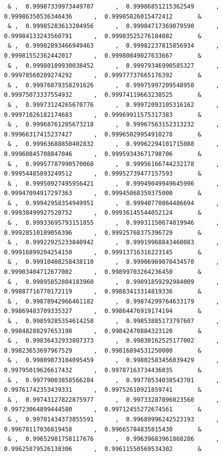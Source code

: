 \documentclass[a4paper,10pt]{report}
\begin{document}
{\begin{verbatim}
 & ,  0.99987339973449707      ,  0.99986851215362549      ,  0.99986350536346436      ,  0.99985826015472412       &
 & ,  0.99985283613204956      ,  0.99984717369079590      ,  0.99984133243560791      ,  0.99983525276184082       &
 & ,  0.99982893466949463      ,  0.99982237815856934      ,  0.99981552362442017      ,  0.99980849027633667       &
 & ,  0.99980109930038452      ,  0.99979346990585327      ,  0.99978560209274292      ,  0.99977737665176392       &
 & ,  0.99976879358291626      ,  0.99975997209548950      ,  0.99975073337554932      ,  0.99974119663238525       &
 & ,  0.99973124265670776      ,  0.99972093105316162      ,  0.99971026182174683      ,  0.99969911575317383       &
 & ,  0.99968761205673218      ,  0.99967563152313232      ,  0.99966317415237427      ,  0.99965029954910278       &
 & ,  0.99963688850402832      ,  0.99962294101715088      ,  0.99960845708847046      ,  0.99959343671798706       &
 & ,  0.99957787990570068      ,  0.99956166744232178      ,  0.99954485893249512      ,  0.99952739477157593       &
 & ,  0.99950927495956421      ,  0.99949049949645996      ,  0.99947094917297363      ,  0.99945068359375000       &
 & ,  0.99942958354949951      ,  0.99940770864486694      ,  0.99938499927520752      ,  0.99936145544052124       &
 & ,  0.99933695793151855      ,  0.99931150674819946      ,  0.99928510189056396      ,  0.99925768375396729       &
 & ,  0.99922925233840942      ,  0.99919968843460083      ,  0.99916899204254150      ,  0.99913716316223145       &
 & ,  0.99910408258438110      ,  0.99906969070434570      ,  0.99903404712677002      ,  0.99899703264236450       &
 & ,  0.99895852804183960      ,  0.99891859292984009      ,  0.99887716770172119      ,  0.99883413314819336       &
 & ,  0.99878942966461182      ,  0.99874299764633179      ,  0.99869483709335327      ,  0.99864476919174194       &
 & ,  0.99859285354614258      ,  0.99853885173797607      ,  0.99848288297653198      ,  0.99842470884323120       &
 & ,  0.99836432933807373      ,  0.99830162525177002      ,  0.99823653697967529      ,  0.99816894531250000       &
 & ,  0.99809873104095459      ,  0.99802583456039429      ,  0.99795019626617432      ,  0.99787163734436035       &
 & ,  0.99779003858566284      ,  0.99770534038543701      ,  0.99761742353439331      ,  0.99752610921859741       &
 & ,  0.99743127822875977      ,  0.99733287096023560      ,  0.99723064899444580      ,  0.99712455272674561       &
 & ,  0.99701434373855591      ,  0.99689996242523193      ,  0.99678117036819458      ,  0.99665784835815430       &
 & ,  0.99652981758117676      ,  0.99639683961868286      ,  0.99625879526138306      ,  0.99611550569534302       &

\end{verbatim}}
\end{document}
